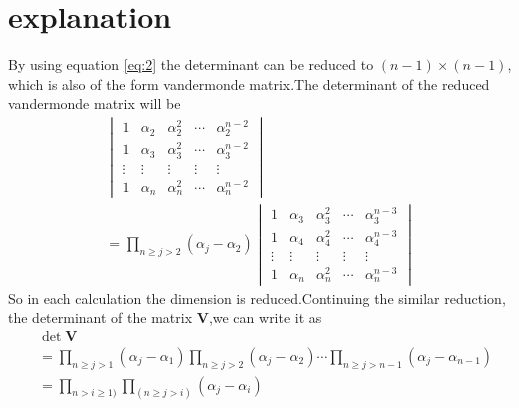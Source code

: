 \documentclass[journal,12pt,twocolumn]{IEEEtran}
\providecommand{\brak}[1]{\ensuremath{\left(#1\right)}}
\newcommand{\mydet}[1]{\ensuremath{\begin{vmatrix}#1\end{vmatrix}}}
\numberwithin{equation}{subsection}
\let\vec\mathbf
\begin{document}
\section{explanation}
By using equation \eqref{eq:2} the determinant can be reduced to $\brak{n-1}\times \brak{n-1}$, which is also of the form vandermonde matrix.The determinant of the reduced vandermonde matrix will be
\begin{align}
    {\mydet{1&\alpha_2&\alpha_2^2&\cdots&\alpha_2^{n-2}\\1&\alpha_3&\alpha_3^2&\cdots&\alpha_3^{n-2}\\\vdots&\vdots&\vdots&\vdots&\vdots\\1&\alpha_{n}&\alpha_{n}^2&\cdots&\alpha_{n}^{n-2}}}\\
    =\prod_{n\geq j >2} (\alpha_{j}-\alpha_{2}) {\mydet{1&\alpha_3&\alpha_3^2&\cdots&\alpha_3^{n-3}\\1&\alpha_4&\alpha_4^2&\cdots&\alpha_4^{n-3}\\\vdots&\vdots&\vdots&\vdots&\vdots\\1&\alpha_{n}&\alpha_{n}^2&\cdots&\alpha_{n}^{n-3}}}
\end{align}
So in each calculation the dimension is reduced.Continuing the similar reduction, the determinant of the matrix $\vec{V}$,we can write it as
\begin{align}
    &\det{\vec{V}}\\
    &=\prod_{n\geq j >1} (\alpha_{j}-\alpha_{1})\prod_{n\geq j >2}(\alpha_{j}-\alpha_{2})\cdots\prod_{n\geq j >n-1} (\alpha_{j}-\alpha_{n-1})\\
    &=\prod_{n> i\geq 1)}\prod_{(n\geq j>i )}(\alpha_{j}-\alpha_{i})
\end{align}
\end{document}
